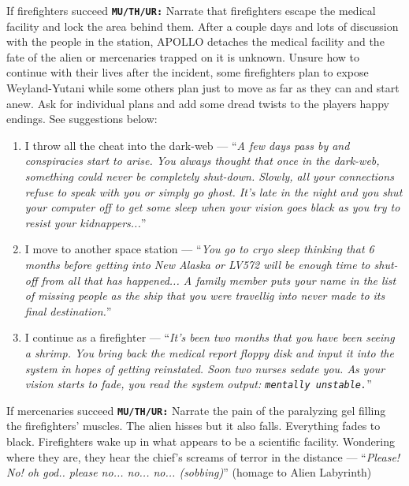 \begin{rpg-commentbox}{If firefighters succeed}
    \texttt{\textbf{MU/TH/UR:}} Narrate that firefighters escape the medical facility and lock the area behind them. After a couple days and lots of discussion with the people in the station, APOLLO detaches the medical facility and the fate of the alien or mercenaries trapped on it is unknown. Unsure how to continue with their lives after the incident, some firefighters plan to expose Weyland-Yutani while some others plan just to move as far as they can and start anew. 
    Ask for individual plans and add some dread twists to the players happy endings. 
    See suggestions below:

    \begin{enumerate}
        \item I throw all the cheat into the dark-web ---
        ``\textit{A few days pass by and conspiracies start to arise. You always thought that once in the dark-web, something could never be completely shut-down. Slowly, all your connections refuse to speak with you or simply go ghost. It's late in the night and you shut your computer off to get some sleep when your vision goes black as you try to resist your kidnappers...}''

        \item I move to another space station ---
        ``\textit{You go to cryo sleep thinking that 6 months before getting into New Alaska or LV572 will be enough time to shut-off from all that has happened... A family member puts your name in the list of missing people as the ship that you were travellig into never made to its final destination.}''


        \item I continue as a firefighter --- ``\textit{It's been two months that you have been seeing a shrimp. You bring back the medical report floppy disk and input it into the system in hopes of getting reinstated. Soon two nurses sedate you. As your vision starts to fade, you read the system output: \texttt{mentally unstable.}}''
    \end{enumerate}
\end{rpg-commentbox}



\begin{rpg-commentbox}{If mercenaries succeed}
    \texttt{\textbf{MU/TH/UR:}} Narrate the pain of the paralyzing gel filling the firefighters' muscles. 
    The alien hisses but it also falls. Everything fades to black. Firefighters wake up in what appears to be a scientific facility. Wondering where they are, they hear the chief's screams of terror in the  distance --- ``\textit{Please! No! oh god.. please no... no... no... (sobbing)}'' (homage to Alien Labyrinth)
\end{rpg-commentbox}


